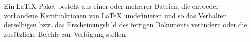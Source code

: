 

%
{%
Ein LaTeX-Paket besteht aus einer oder mehrerer Dateien, die entweder vorhandene
Kernfunktionen von LaTeX umdefinieren und so das Verhalten derselbigen bzw.
das Erscheinungsbild des fertigen Dokuments verändern oder die zusätzliche
Befehle zur Verfügung stellen.}


